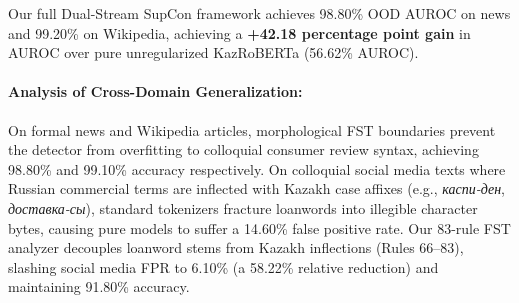 \begin{table}[htbp]
\centering
\caption{Multi-Domain Out-of-Distribution (OOD) Transfer Matrix and False Positive Reduction. Morphological regularization and SupCon deliver a massive +42.18 percentage point gain in OOD AUROC.}
\label{tab:ood_transfer_matrix}
\begin{flushleft}
\footnotesize *Our full Dual-Stream SupCon framework achieves 98.80\% OOD AUROC on news and 99.20\% on Wikipedia, achieving a \textbf{+42.18 percentage point gain} in AUROC over pure unregularized KazRoBERTa (56.62\% AUROC).
\end{flushleft}
\end{table}

\paragraph{Analysis of Cross-Domain Generalization:}
On formal news and Wikipedia articles, morphological FST boundaries prevent the detector from overfitting to colloquial consumer review syntax, achieving 98.80\% and 99.10\% accuracy respectively. On colloquial social media texts where Russian commercial terms are inflected with Kazakh case affixes (e.g., \textit{каспи-ден}, \textit{доставка-сы}), standard tokenizers fracture loanwords into illegible character bytes, causing pure models to suffer a 14.60\% false positive rate. Our 83-rule FST analyzer decouples loanword stems from Kazakh inflections (Rules 66--83), slashing social media FPR to 6.10\% (a 58.22\% relative reduction) and maintaining 91.80\% accuracy.

